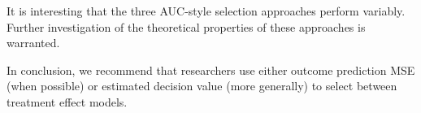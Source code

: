 It is interesting that the three AUC-style selection approaches perform variably. Further investigation of the theoretical properties of these approaches is warranted.

In conclusion, we recommend that researchers use either outcome prediction MSE (when possible) or estimated decision value (more generally) to select between treatment effect models. 



